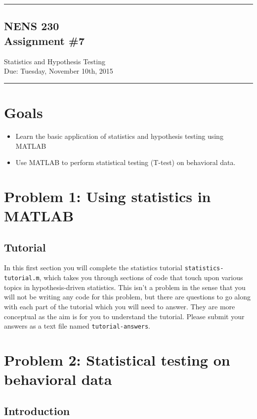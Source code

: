 \documentclass[10pt,letter]{article}
\newcommand{\horrule}[1]{\rule{\linewidth}{#1}} %
\begin{document}

\horrule{1pt}
\begin{center}
\section*{NENS 230\\ Assignment \#7}
Statistics and Hypothesis Testing\\
Due: Tuesday, November 10th, 2015
\end{center}
\horrule{1pt}

\section*{Goals}
\begin{itemize}
    \item Learn the basic application of statistics and hypothesis testing using MATLAB
    \item Use MATLAB to perform statistical testing (T-test) on behavioral data.
\end{itemize}

\section*{Problem 1: Using statistics in MATLAB}

\subsection*{Tutorial}

In this first section you will complete the statistics tutorial \texttt{statistics-tutorial.m}, which takes you through sections of code that touch upon various topics in hypothesis-driven statistics. This isn't a problem in the sense that you will not be writing any code for this problem, but there are questions to go along with each part of the tutorial which you will need to answer. They are more conceptual as the aim is for you to understand the tutorial. Please submit your answers as a text file named \texttt{tutorial-answers}.

\section*{Problem 2: Statistical testing on behavioral data}

\subsection*{Introduction}
\end{document}
